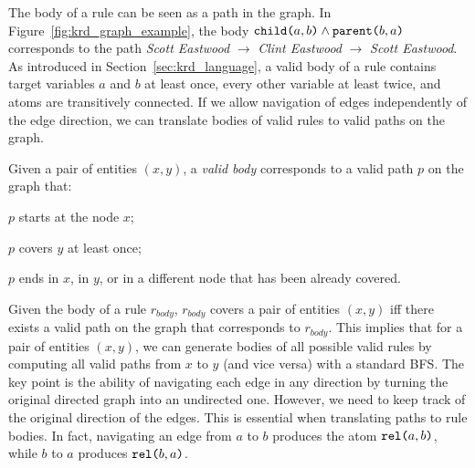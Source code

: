 The body of a rule can be seen as a path in the graph. In Figure~\ref{fig:krd_graph_example}, the body $\texttt{child(}a,b\texttt{)} \wedge \texttt{parent(}b,a\texttt{)}$ corresponds to the path \textit{Scott Eastwood} $\rightarrow$ \textit{Clint Eastwood} $\rightarrow$ \textit{Scott Eastwood}. 
As introduced in Section~\ref{sec:krd_language}, a valid body of a rule contains target variables $a$ and $b$ at least once, every other variable at least twice, and atoms are transitively connected. 
If we allow navigation of edges independently of the edge direction, we can translate bodies of valid rules to valid paths on the graph.
\begin{inparaenum}[(i)]
	Given a pair of entities $(x,y)$, a {\em valid body} corresponds to a valid path $p$ on the graph that:
	\item $p$ starts at the node $x$;
	\item $p$ covers $y$ at least once;
	\item $p$ ends in $x$, in $y$, or in a different node that has been already covered.
\end{inparaenum}
%
Given the body of a rule $r_{body}$, $r_{body}$ covers a pair of entities $(x,y)$ iff there exists a valid path on the graph that corresponds to $r_{body}$. This implies that for a pair of entities $(x,y)$, we can generate bodies of all possible valid rules by computing all valid paths from $x$ to $y$ (and vice versa) with a standard BFS. The key point is the ability of navigating each edge in any direction by turning the original directed graph into an undirected one.
However, we need to keep track of the original direction of the edges. This is essential when translating paths to rule bodies. In fact, %
navigating an edge from $a$ to $b$ produces the atom $\texttt{rel(}a,b\texttt{)}$, while $b$ to $a$ produces $\texttt{rel(}b,a\texttt{)}$. 

